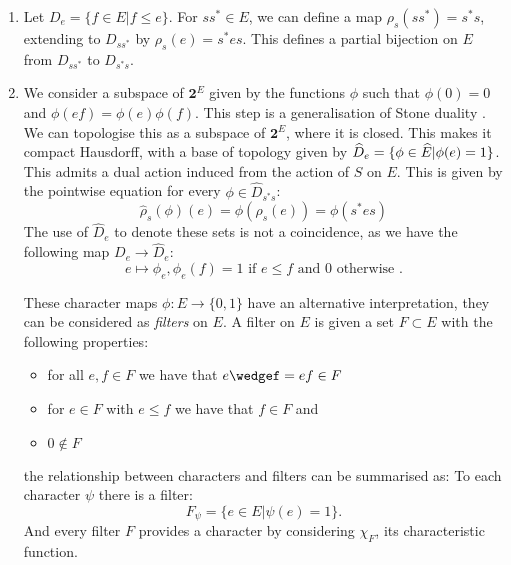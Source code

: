 \begin{definition}

\begin{enumerate}
\item Let $D_{e}=\lbrace f \in E | f \leq e \rbrace$. For $ss^{*} \in E$, we can define a map $\rho_{s}(ss^{*})=s^{*}s$, extending to $D_{ss^{*}}$ by $\rho_{s}(e) = s^{*}es$. This defines a partial bijection on $E$ from $D_{ss^{*}}$ to $D_{s^{*}s}$. 

\item We consider a subspace of $\textbf{2}^{E}$ given by the functions $\phi$ such that $\phi(0)=0$ and $\phi(ef)=\phi(e)\phi(f)$. This step is a generalisation of Stone duality \cite{Lawson-2010}. We can topologise this as a subspace of $\textbf{2}^{E}$, where it is closed. This makes it compact Hausdorff, with a base of topology given by $\widehat{D}_{e}= \lbrace \phi \in \widehat{E} | \phi(e)=1 \rbrace$. This admits a dual action induced from the action of $S$ on $E$. This is given by the pointwise equation for every $\phi \in \widehat{D}_{s^{*}s}$:
\begin{equation*}
\widehat{\rho}_{s}(\phi)(e)=\phi(\rho_{s}(e))=\phi(s^{*}es)
\end{equation*}
The use of $\widehat{D}_{e}$ to denote these sets is not a coincidence, as we have the following map $D_{e} \rightarrow \widehat{D}_{e}$:
\begin{equation*}
e \mapsto \phi_{e}, \phi_{e}(f)=1 \mbox{ if } e \leq f \mbox{ and } 0 \mbox{ otherwise }.
\end{equation*}
\begin{remark}
These character maps $\phi: E \rightarrow \lbrace 0,1 \rbrace$ have an alternative interpretation, they can be considered as \textit{filters} on $E$. A filter on $E$ is given  a set $F \subset E$ with the following properties:
\begin{itemize}
\item for all $e,f \in F$ we have that $e\wedgef=ef \in F$
\item for $e\in F$ with $e \leq f$ we have that $f \in F$ and
\item $0 \not\in F$
\end{itemize}
the relationship between characters and filters can be summarised as: To each character $\psi$ there is a filter:
\begin{equation*}
F_{\psi}= \lbrace e \in E | \psi(e)=1 \rbrace.
\end{equation*}
And every filter $F$ provides a character by considering $\chi_{F}$, its characteristic function.
\end{remark}


\end{enumerate}
\end{definition}
